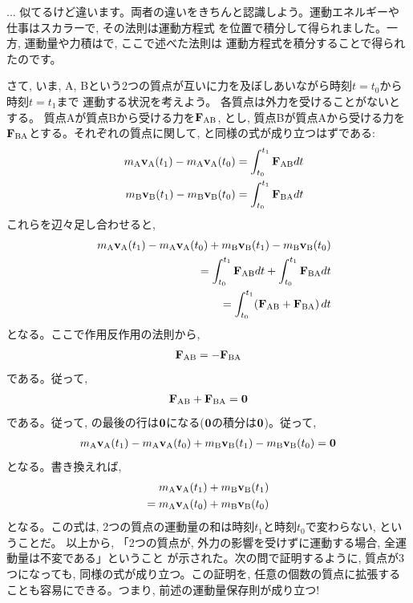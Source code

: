 \begin{faq}{\small{}
... 似てるけど違います。両者の違いをきちんと認識しよう。運動エネルギーや仕事はスカラーで, その法則は運動方程式
を位置で積分して得られました。一方, 運動量や力積はで, ここで述べた法則は
運動方程式を積分することで得られたのです。}\end{faq}\mv

さて, いま, A, Bという2つの質点が互いに力を及ぼしあいながら時刻$t=t_0$から時刻$t=t_1$まで
運動する状況を考えよう。
各質点は外力を受けることがないとする。
質点Aが質点Bから受ける力を${\bf F}_{\text {AB}}$, とし, 
質点Bが質点Aから受ける力を${\bf F}_{\text {BA}}$とする。それぞれの質点に関して, 
と同様の式が成り立つはずである:
\begin{eqnarray}
&&m_{\text A}{\bf v}_{\text A}(t_1)-m_{\text A}{\bf v}_{\text A}(t_0)=\int_{t_0}^{t_1}{\bf F}_{\text {AB}}dt\label{eq:momentumA}\\
&&m_{\text B}{\bf v}_{\text B}(t_1)-m_{\text B}{\bf v}_{\text B}(t_0)=\int_{t_0}^{t_1}{\bf F}_{\text {BA}}dt\label{eq:momentumB}
\end{eqnarray}
これらを辺々足し合わせると, 
\begin{eqnarray}
&&m_{\text A}{\bf v}_{\text A}(t_1)-m_{\text A}{\bf v}_{\text A}(t_0)+m_{\text B}{\bf v}_{\text B}(t_1)-m_{\text B}{\bf v}_{\text B}(t_0)\nonumber\\
&&=\int_{t_0}^{t_1}{\bf F}_{\text {AB}}dt+\int_{t_0}^{t_1}{\bf F}_{\text {BA}}dt\nonumber\\
&&=\int_{t_0}^{t_1}({\bf F}_{\text {AB}}+{\bf F}_{\text {BA}})\,dt\label{eq:momentumABsum}
\end{eqnarray}
となる。ここで作用反作用の法則から, 
\begin{eqnarray} 
{\bf F}_{\text {AB}}=-{\bf F}_{\text {BA}}
\end{eqnarray} 
である。従って, 
\begin{eqnarray} 
{\bf F}_{\text {AB}}+{\bf F}_{\text {BA}}={\bf 0}
\end{eqnarray}
である。従って, の最後の行は${\bf 0}$になる(${\bf 0}$の積分は${\bf 0}$)。従って, 
\begin{eqnarray*} 
m_{\text A}{\bf v}_{\text A}(t_1)-m_{\text A}{\bf v}_{\text A}(t_0)+m_{\text B}{\bf v}_{\text B}(t_1)-m_{\text B}{\bf v}_{\text B}(t_0)={\bf 0}
\end{eqnarray*}
となる。書き換えれば, 
\begin{eqnarray} 
m_{\text A}{\bf v}_{\text A}(t_1)+m_{\text B}{\bf v}_{\text B}(t_1)\nonumber\\
=m_{\text A}{\bf v}_{\text A}(t_0)+m_{\text B}{\bf v}_{\text B}(t_0)\label{eq:consmom000}
\end{eqnarray} 
となる。この式は, 2つの質点の運動量の和は時刻$t_1$と時刻$t_0$で変わらない, ということだ。
以上から, 「2つの質点が, 外力の影響を受けずに運動する場合, 全運動量は不変である」ということ
が示された。次の問で証明するように, 質点が3つになっても, 同様の式が成り立つ。この証明を, 
任意の個数の質点に拡張することも容易にできる。つまり, 前述の運動量保存則が成り立つ!

